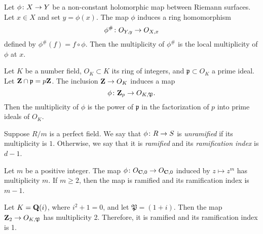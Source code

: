 \documentclass[12pt]{article}
\begin{document}
\begin{example}
  Let $\phi {\colon} X \to Y$ be a non-constant holomorphic map between Riemann surfaces.
  Let $x \in X$ and set $y = \phi(x)$.
  The map $\phi$ induces a ring homomorphism
  \[ \phi^{\#} {\colon} O_{Y,y} \to O_{X,x}\]
  defined by $\phi^\# (f) = f \circ \phi$.
  Then the multiplicity of $\phi^\#$ is the local multiplicity of $\phi$ at $x$.
\end{example}

\begin{example}
  Let $K$ be a number field, $O_K \subset K$ its ring of integers, and $\mathfrak p \subset O_K$ a prime ideal.
  Let ${\bf Z} \cap \mathfrak p = p{\bf Z}$.
  The inclusion ${\bf Z} \to O_K$ induces a map
  \[ \phi {\colon} {\bf Z}_p \to O_{K, \mathfrak P}.\]
  Then the multiplicity of $\phi$ is the power of $\mathfrak p$ in the factorization of $p$ into prime ideals of $O_K$.
\end{example}

Suppose $R/m$ is a perfect field.
We say that $\phi {\colon} R \to S$ is \emph{unramified} if its multiplicity is $1$.
Otherwise, we say that it is \emph{ramified} and its \emph{ramification index} is $d - 1$.

\begin{example}
  Let $m$ be a positive integer.
  The map $\phi {\colon} O_{{\bf C}, 0} \to O_{{\bf C}, 0}$ induced by $z \mapsto z^m$ has multiplicity $m$.
  If $m \geq 2$, then the map is ramified and its ramification index is $m-1$.
\end{example}

\begin{example}
  Let $K = {\bf Q}(i)$, where $i^2 + 1 = 0$, and let $\mathfrak P = (1+i)$.
  Then the map ${\bf Z}_2 \to O_{K, \mathfrak P}$ has multiplicity 2.
  Therefore, it is ramified and its ramification index is 1.
\end{example}
\end{document}
